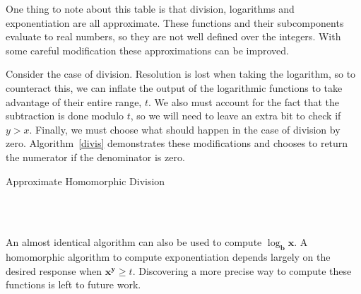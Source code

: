 \documentclass{article}
\begin{document}
        One thing to note about this table is that division, logarithms and exponentiation are all approximate.
        These functions and their subcomponents evaluate to real numbers, so they are not well defined over the integers.
        With some careful modification these approximations can be improved.

        Consider the case of division.
        Resolution is lost when taking the logarithm, so
        to counteract this, we can inflate the output of the logarithmic functions
        to take advantage of their entire range, $t$.
        We also must account for the fact that the subtraction is done modulo $t$, 
        so we will need to leave an extra bit to check if $y > x$.
        Finally, we must choose what should happen in the case of division by zero.
        Algorithm~\ref{divis} demonstrates these modifications and chooses to return the numerator if the denominator is zero.

    \begin{algorithm}
        \caption{Approximate Homomorphic Division}\label{divis}
        \begin{algorithmic}
                    \State{}
                \Else%
                    \State{}
                \EndIf%
            \EndFunction%
            \\
                    \State{}
                \Else%
                    \State{}
                \EndIf%
            \EndFunction%
            \\
                \State{}
            \EndFunction%
        \end{algorithmic}
    \end{algorithm}

        An almost identical algorithm can also be used to compute $\log_\mathbf{b}\mathbf{x}$.
        A homomorphic algorithm to compute exponentiation depends largely on the desired response when $\mathbf{x}^\mathbf{y} \geq t$.
        Discovering a more precise way to compute these functions is left to future work.
        
\end{document}
